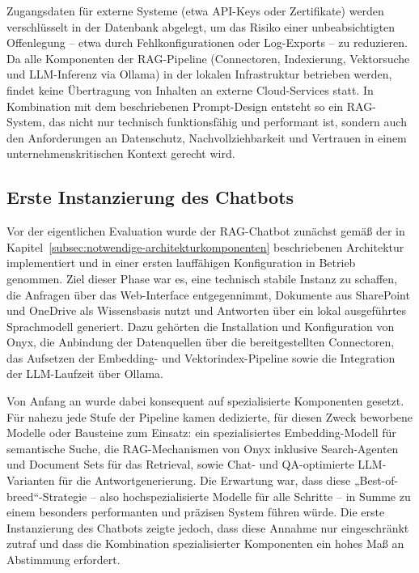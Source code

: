 Zugangsdaten für externe Systeme (etwa API-Keys oder Zertifikate) werden verschlüsselt in der Datenbank abgelegt, um das Risiko einer unbeabsichtigten Offenlegung – etwa durch Fehlkonfigurationen oder Log-Exports – zu reduzieren.
Da alle Komponenten der RAG-Pipeline (Connectoren, Indexierung, Vektorsuche und LLM-Inferenz via Ollama) in der lokalen Infrastruktur betrieben werden, findet keine Übertragung von Inhalten an externe Cloud-Services statt.
In Kombination mit dem beschriebenen Prompt-Design entsteht so ein RAG-System, das nicht nur technisch funktionsfähig und performant ist, sondern auch den Anforderungen an Datenschutz, Nachvollziehbarkeit und Vertrauen in einem unternehmenskritischen Kontext gerecht wird.

\subsection{Erste Instanzierung des Chatbots}\label{subsec:erste-instanzierung-des-chatbots}

Vor der eigentlichen Evaluation wurde der RAG-Chatbot zunächst gemäß der in Kapitel~\ref{subsec:notwendige-architekturkomponenten} beschriebenen Architektur implementiert und in einer ersten lauffähigen Konfiguration in Betrieb genommen.
Ziel dieser Phase war es, eine technisch stabile Instanz zu schaffen, die Anfragen über das Web-Interface entgegennimmt, Dokumente aus SharePoint und OneDrive als Wissensbasis nutzt und Antworten über ein lokal ausgeführtes Sprachmodell generiert.
Dazu gehörten die Installation und Konfiguration von Onyx, die Anbindung der Datenquellen über die bereitgestellten Connectoren, das Aufsetzen der Embedding- und Vektorindex-Pipeline sowie die Integration der LLM-Laufzeit über Ollama.

Von Anfang an wurde dabei konsequent auf spezialisierte Komponenten gesetzt.
Für nahezu jede Stufe der Pipeline kamen dedizierte, für diesen Zweck beworbene Modelle oder Bausteine zum Einsatz: ein spezialisiertes Embedding-Modell für semantische Suche, die RAG-Mechanismen von Onyx inklusive Search-Agenten und Document Sets für das Retrieval, sowie Chat- und QA-optimierte LLM-Varianten für die Antwortgenerierung.
Die Erwartung war, dass diese „Best-of-breed“-Strategie – also hochspezialisierte Modelle für alle Schritte – in Summe zu einem besonders performanten und präzisen System führen würde.
Die erste Instanzierung des Chatbots zeigte jedoch, dass diese Annahme nur eingeschränkt zutraf und dass die Kombination spezialisierter Komponenten ein hohes Maß an Abstimmung erfordert.

